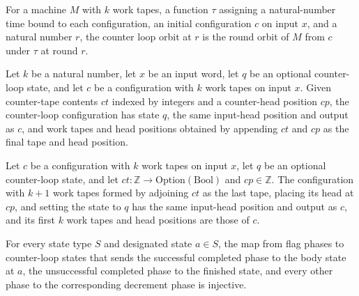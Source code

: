 \begin{definition}
\label{Turing.counterLoopOrbit}
\leanok
{}
For a machine $M$ with $k$ work tapes, a function $\tau$ assigning a natural-number time
bound to each configuration, an initial configuration $c$ on input $x$, and a natural
number $r$, the counter loop orbit at $r$ is the round orbit of $M$ from $c$ under
$\tau$ at round $r$.
\end{definition}

\begin{lemma}
\label{Turing.counter_layout}
\leanok
{}
Let $k$ be a natural number, let $x$ be an input word, let $q$ be an optional
counter-loop state, and let $c$ be a configuration with $k$ work tapes on input $x$.
Given counter-tape contents $ct$ indexed by integers and a counter-head position $cp$,
the counter-loop configuration has state $q$, the same input-head position and output as
$c$, and work tapes and head positions obtained by appending $ct$ and $cp$ as the final
tape and head position.
\end{lemma}

\begin{theorem}
\label{Turing.counter_cfg_eq}
\leanok
{}
Let $c$ be a configuration with $k$ work tapes on input $x$, let $q$ be an optional
counter-loop state, and let $ct:\mathbb{Z}\to\mathrm{Option}(\mathrm{Bool})$ and
$cp\in\mathbb{Z}$. The configuration with $k+1$ work tapes formed by adjoining $ct$ as
the last tape, placing its head at $cp$, and setting the state to $q$ has the same
input-head position and output as $c$, and its first $k$ work tapes and head positions
are those of $c$.
\end{theorem}

\begin{lemma}
\label{Turing.counter_dec_injective}
\leanok
{}
For every state type $S$ and designated state $a\in S$, the map from flag phases to
counter-loop states that sends the successful completed phase to the body state at $a$,
the unsuccessful completed phase to the finished state, and every other phase to the
corresponding decrement phase is injective.
\end{lemma}

